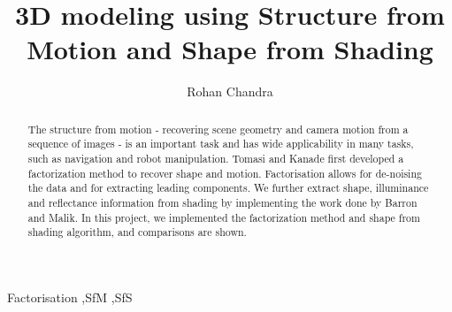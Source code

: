 \documentclass[preprint,12pt]{elsarticle}
\begin{document}
\begin{frontmatter}


\title{3D modeling using Structure from Motion and Shape from Shading}



\author{Rohan Chandra}

\address{(CMSC 828G: Project 2))}

\begin{abstract}
The structure from motion - recovering scene geometry and camera motion from a sequence of images
- is an important task and has wide applicability in many tasks, such as navigation and robot manipulation.
Tomasi and Kanade first developed a factorization method to recover shape and motion. Factorisation allows for de-noising the data and for extracting leading components. We further extract shape, illuminance and reflectance information from shading by implementing the work done by Barron and Malik. 
In this project, we implemented the factorization method and shape from shading algorithm, and comparisons are shown.
\end{abstract}

\begin{keyword}
Factorisation \sep SfM \sep SfS


\end{keyword}

\end{frontmatter}
\end{document}
